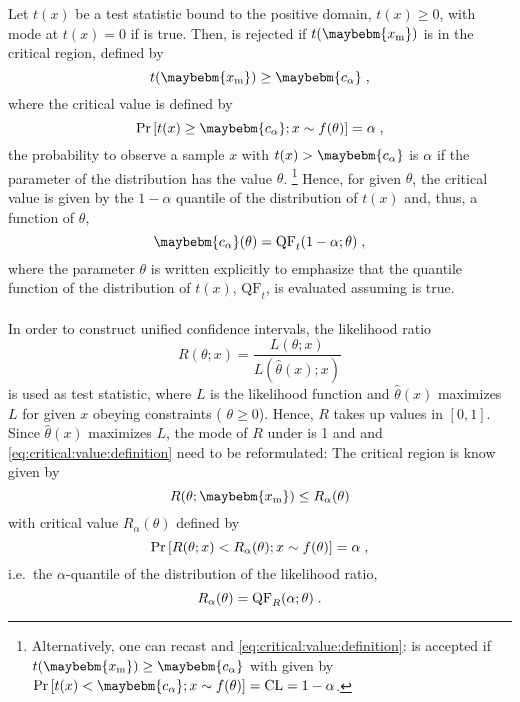 \documentclass[a4paper]{article}
\newcommand*\Hnull{\maybebm{\mathrm{H}_0}\xspace}
\newcommand*\Prob{\mathrm{Pr}}
\newcommand*\xm{\maybebm{x_{\mathrm{m}}}\xspace}
\newcommand*\ta{\maybebm{c_\alpha}\xspace}
\newcommand*\QF{\mathrm{QF}}
\begin{document}
Let $t(x)$ be a test statistic bound to the positive domain, $t(x) \geq
0$, with mode at $t(x) = 0$ if \Hnull is true. Then, \Hnull is rejected
if $t(\xm)$ is in the critical region, defined by
%
\begin{equation}
  \label{eq:hnull:rejection}
  t(\xm) \geq \ta
  \fcomma
\end{equation}
%
where the critical value \ta is defined by
%
\begin{equation}
  \label{eq:critical:value:definition}
  \Prob\left[ t(x) \geq \ta; x \sim f(\theta)\right] = \alpha
  \fcomma
\end{equation}
%
\ie the probability to observe a sample $x$ with $t(x) > \ta$ is
$\alpha$ if the parameter of the distribution has the value $\theta$.%
\footnote{%
  Alternatively, one can recast  and
  \eqref{eq:critical:value:definition}: \Hnull is accepted if
  $t(\xm) \geq \ta$
  with \ta given by
  $\Pr\left[ t(x) < \ta; x \sim f(\theta) \right] = \CL = 1 - \alpha$.
}%
Hence, for given $\theta$, the critical value \ta is given by the
$1-\alpha$ quantile of the distribution of $t(x)$ and, thus, a function of
$\theta$,
%
\begin{equation*}
  \ta(\theta) = \QF_t(1-\alpha; \theta)
  \fcomma
\end{equation*}
%
where the parameter $\theta$ is written explicitly to emphasize that the
quantile function of the distribution of $t(x)$, $\QF_t$, is evaluated assuming \Hnull is true.

\paragraph{}
In order to construct unified confidence intervals, the likelihood ratio
%
\begin{equation*}
  R(\theta; x) = \frac{L(\theta; x)}{L(\hat{\theta}(x); x)}
\end{equation*}
is used as test statistic\cite{Feldman1998}, where $L$ is the likelihood function and
$\hat{\theta}(x)$ maximizes $L$ for given $x$ obeying constraints (\eg
$\theta \geq 0$).
Hence, $R$ takes up values in
$[0,1]$. Since $\hat{\theta}(x)$ maximizes $L$, the mode of $R$ under
\Hnull is 1 and  and
\eqref{eq:critical:value:definition} need to be reformulated: 
The critical region is know given by
%
\begin{equation}
  \label{eq:hnull:rejection:likelihood:ratio}
  R(\theta; \xm) \leq R_\alpha(\theta)
\end{equation}
%
with critical value $R_\alpha(\theta)$ defined by 
%
\begin{equation}
  \label{eq:critical:value:definition:likelihood:ratio}
  \Pr\left[ R(\theta; x) < R_\alpha(\theta); x \sim f(\theta)  \right] = \alpha
  \;,
\end{equation}
%
i.e.~the $\alpha$-quantile of the distribution of the likelihood ratio,
%
\begin{equation*}
  R_\alpha(\theta) = \QF_R(\alpha; \theta)
  \fstop
\end{equation*}
%
\end{document}
